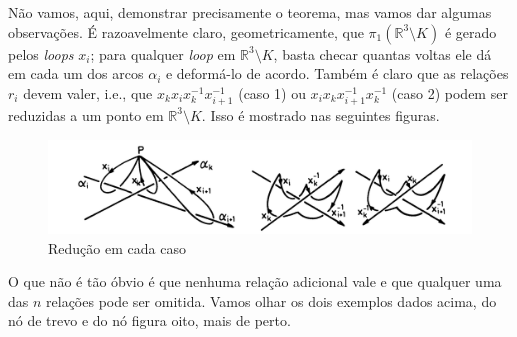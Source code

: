 	Não vamos, aqui, demonstrar precisamente o teorema, mas vamos dar algumas observações. 
	É razoavelmente claro, geometricamente, que $\pi_1(\mathbb{R}^3\setminus K)$ é gerado 
	pelos \textit{loops} $x_i$; para qualquer \textit{loop} em $\mathbb{R}^3\setminus K$, 
	basta checar quantas voltas ele dá em cada um dos arcos $\alpha_i$ e deformá-lo de acordo. 
	Também é claro que as relações $r_i$ devem valer, i.e., que $x_kx_ix_k^{-1}x_{i+1}^{-1}$ (caso 1) 
	ou $x_ix_kx_{i+1}^{-1}x_k^{-1}$ (caso 2) podem ser reduzidas a um ponto em $\mathbb{R}^3\setminus K$. 
	Isso é mostrado nas seguintes figuras.
	\begin{figure}[H]
		\begin{center}
			\includegraphics[width=15cm]{Images/deformacaoloops.png}
		\end{center}\caption{Redução em cada caso}
	\end{figure}
	O que não é tão óbvio é que nenhuma relação adicional vale e que qualquer uma das $n$ 
	relações pode ser omitida. Vamos olhar os dois exemplos dados acima, do nó de trevo e 
	do nó figura oito, mais de perto.

